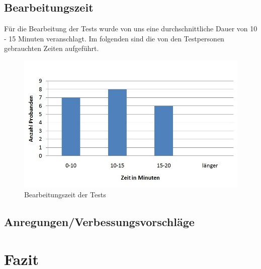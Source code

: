 \subsection{Bearbeitungszeit}
Für die Bearbeitung der Tests wurde von uns eine durchschnittliche Dauer von 10 - 15 Minuten veranschlagt. Im folgenden sind die 
von den Testpersonen gebrauchten Zeiten aufgeführt.

\begin{figure}[h]
\centering
\includegraphics[width=0.7\linewidth]{img/Gesamtzeit}
\caption{Bearbeitungszeit der Tests}
\label{fig:Gesamtzeit}
\end{figure}


\subsection{Anregungen/Verbessungsvorschläge}

\section{Fazit}